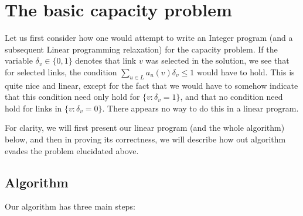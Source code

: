 \documentclass[11pt]{amsart}
\begin{document}
\section{The basic capacity problem}

Let us first consider how one would attempt to write an Integer
program (and a subsequent Linear programming relaxation) for the
capacity problem. If the variable $\delta_v \in \{0, 1\}$ denotes that
link $v$ was selected in the solution, we see that for selected
links, the condition $\sum_{u \in L} a_u(v) \delta_v \leq 1$ would
have to hold. This is quite nice and linear, except for the fact that
we would have to somehow indicate that this condition need only hold
for $\{v : \delta_v = 1\}$, and that no condition need hold for
links in $\{v : \delta_v = 0\}$. There appears no way to do this
in a linear program. 


For clarity, we will first present our linear program (and the whole algorithm) below, and then in proving its correctness, we will
describe how out algorithm evades the problem elucidated above.

\subsection{Algorithm}
Our algorithm has three main steps:
\end{document}

